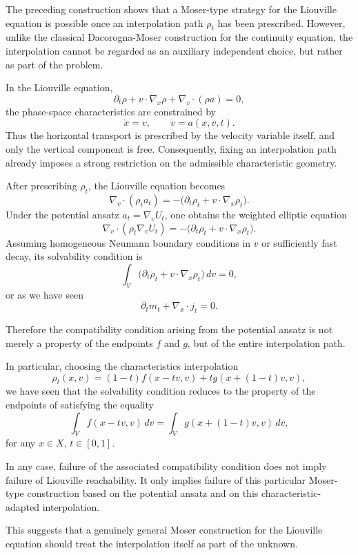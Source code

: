 \documentclass[11pt]{article}
\begin{document}
The preceding construction shows that a Moser-type strategy for the
Liouville equation is possible once an interpolation path
\(\rho_t\) has been prescribed. However, unlike the classical
Dacorogna-Moser construction for the continuity equation, the interpolation
cannot be regarded as an auxiliary independent choice, but rather as part of the problem.

In the Liouville equation,
\[
\partial_t\rho
+
v\cdot\nabla_x\rho
+
\nabla_v\cdot(\rho a)=0,
\]
the phase-space characteristics are constrained by
\[
\dot x=v,
\qquad
\dot v=a(x,v,t).
\]
Thus the horizontal transport is prescribed by the velocity variable itself,
and only the vertical component is free. Consequently, fixing an
interpolation path already imposes a strong restriction on the admissible
characteristic geometry.

After prescribing \(\rho_t\), the Liouville equation becomes
\[
\nabla_v\cdot(\rho_t a_t)
=
-
\big(
\partial_t\rho_t
+
v\cdot\nabla_x\rho_t
\big).
\]
Under the potential ansatz $a_t=\nabla_v U_t$, 
one obtains the weighted elliptic equation
\[
\nabla_v\cdot(\rho_t\nabla_v U_t)
=
-
\big(
\partial_t\rho_t
+
v\cdot\nabla_x\rho_t
\big).
\]
Assuming homogeneous Neumann boundary conditions in $v$ or sufficiently fast decay, its  solvability condition is
\[
\int_V
\big(
\partial_t\rho_t
+
v\cdot\nabla_x\rho_t
\big)\,dv
=
0 ,
\]
or as we have seen
\[
\partial_t m_t+\nabla_x\cdot j_t=0 .
\]


Therefore the compatibility condition arising from the potential ansatz is not merely a property of the
endpoints \(f\) and \(g\), but of the entire interpolation path. 

In particular, choosing the characteristics interpolation
\[
\rho_t(x,v)
=
(1-t)f(x-tv,v)
+
t g(x+(1-t)v,v), 
\]
we have seen that the solvability condition reduces to the property of the endpoints of satisfying the equality
\[
        \int_V f(x-tv,v)\,dv
        =
        \int_V g(x+(1-t)v,v)\,dv,
\]
for any $x\in X$, $t \in [0,1]$. 

In any case, failure of the associated compatibility condition does not
imply failure of Liouville reachability. It only implies failure of this
particular Moser-type construction based on the potential ansatz and on this characteristic-adapted interpolation. 




This suggests that a genuinely general Moser construction for the Liouville
equation should treat the interpolation itself as part of the unknown.\\
\end{document}
